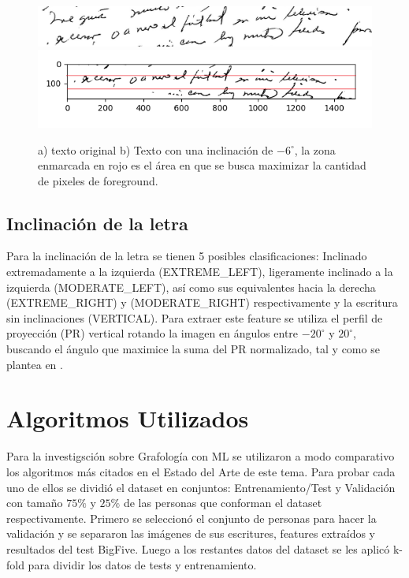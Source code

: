 \documentclass[10pt, a4paper]{article}
\begin{document}
            \begin{figure}[!h]
                \centering
                \includegraphics[width = 0.4\linewidth]{Judith_21.jpg}
                \includegraphics[width = 0.4\linewidth]{Baseline.png}
                \caption{a) texto original b) Texto con una inclinaci\'on de $-6^{\circ}$, la zona enmarcada en rojo es el \'area en que se busca maximizar 
                la cantidad de pixeles de foreground.}
            \end{figure}

        \subsection{Inclinaci\'on de la letra}
            Para la inclinaci\'on de la letra se tienen 5 posibles clasificaciones: Inclinado extremadamente a la izquierda (EXTREME\_LEFT), ligeramente inclinado a la 
            izquierda (MODERATE\_LEFT), as\'i como sus equivalentes hacia la derecha (EXTREME\_RIGHT) y (MODERATE\_RIGHT) respectivamente y la escritura sin inclinaciones (VERTICAL). 
            Para extraer este feature se utiliza el perfil de proyecci\'on (PR) vertical rotando la imagen en \'angulos entre $-20^{\circ}$ y $20^{\circ}$, buscando el \'angulo que maximice
            la suma del PR normalizado, tal y como se plantea en \cite{20}.

    \section{Algoritmos Utilizados}
        Para la investigsci\'on sobre Grafolog\'ia con ML se utilizaron a modo comparativo los algoritmos m\'as citados en el Estado del Arte de este tema. 
        Para probar cada uno de ellos se dividi\'o el dataset en  conjuntos: Entrenamiento/Test y Validaci\'on con tama\~no $75\%$ y $25\%$ de las personas que conforman el dataset respectivamente.
        Primero se seleccion\'o el conjunto de personas para hacer la validaci\'on y se separaron las im\'agenes de sus escritures, features extra\'idos y resultados del test BigFive. Luego a los restantes datos del dataset 
        se les aplic\'o k-fold para dividir los datos de tests y entrenamiento.  
        
\end{document}
